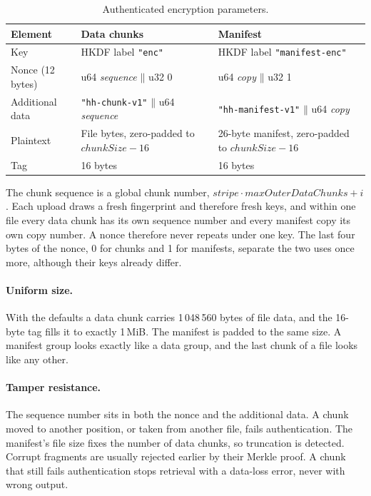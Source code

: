 \documentclass[10pt,a4paper,final]{article}
\newcommand{\code}[1]{\texttt{#1}}
\newcommand{\cat}{\mathbin{\|}}
\begin{document}
\begin{table}[H]
\centering
\small
\begin{tabularx}{\linewidth}{@{}p{2.6cm}LL@{}}
\toprule
Element & Data chunks & Manifest \\
\midrule
Key & HKDF label \code{"enc"} & HKDF label \code{"manifest-enc"} \\
Nonce (12 bytes) & u64 \textit{sequence} $\cat$ u32 0 & u64 \textit{copy} $\cat$ u32 1 \\
Additional data & \code{"hh-chunk-v1"} $\cat$ u64 \textit{sequence} & \code{"hh-manifest-v1"} $\cat$ u64 \textit{copy} \\
Plaintext & File bytes, zero-padded to $\mathit{chunkSize} - 16$ & 26-byte manifest, zero-padded to
$\mathit{chunkSize} - 16$ \\
Tag & 16 bytes & 16 bytes \\
\bottomrule
\end{tabularx}
\caption{Authenticated encryption parameters.}
\end{table}

The chunk sequence is a global chunk number, $\mathit{stripe} \cdot \mathit{maxOuterDataChunks} + i$. Each upload
draws a fresh fingerprint and therefore fresh keys, and within one file every data chunk has its own sequence number
and every manifest copy its own copy number. A nonce therefore never repeats under one key. The last four bytes of
the nonce, 0 for chunks and 1 for manifests, separate the two uses once more, although their keys already differ.

\paragraph{Uniform size.} With the defaults a data chunk carries 1\,048\,560 bytes of file data, and the 16-byte
tag fills it to exactly 1\,MiB. The manifest is padded to the same size. A manifest group looks exactly like a data
group, and the last chunk of a file looks like any other.

\paragraph{Tamper resistance.} The sequence number sits in both the nonce and the additional data. A chunk moved to
another position, or taken from another file, fails authentication. The manifest's file size fixes the number of
data chunks, so truncation is detected. Corrupt fragments are usually rejected earlier by their Merkle proof. A
chunk that still fails authentication stops retrieval with a data-loss error, never with wrong output.
\end{document}
